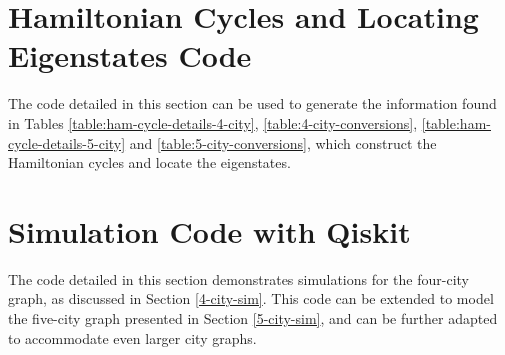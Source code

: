 \documentclass[msc,oneside]{ubcthesis}
\begin{document}
	\appendix
	\chapter{Hamiltonian Cycles and Locating Eigenstates Code}
	
	The code detailed in this section can be used to generate the information found in Tables \ref{table:ham-cycle-details-4-city}, \ref{table:4-city-conversions},  \ref{table:ham-cycle-details-5-city} and \ref{table:5-city-conversions}, which construct the Hamiltonian cycles and locate the eigenstates. 
	
	
	\chapter{Simulation Code with Qiskit}
	
	The code detailed in this section demonstrates simulations for the four-city graph, as discussed in Section \ref{4-city-sim}. This code can be extended to model the five-city graph presented in Section \ref{5-city-sim}, and can be further adapted to accommodate even larger city graphs.
	
	
	
	\backmatter
	
	
	
\end{document}
